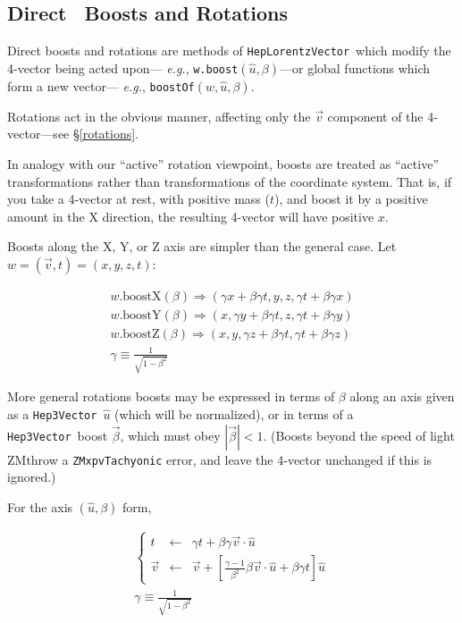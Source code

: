 \documentclass[twoside,12pt]{article}
\def \SV {{\tt Hep3Vector}}
\def \LV {{\tt HepLorentzVector}}
\begin{document}
\subsection{Direct \protect\LV\ Boosts and Rotations}

Direct boosts and rotations are methods of \LV\ which
modify the 4-vector being acted
upon--- {\it e.g.}, {\tt w.boost}$(\hat{u}, \beta)$---or
global functions which form a new
vector--- {\it e.g.}, {\tt boostOf}$(w, \hat{u}, \beta)$.

Rotations act in the obvious manner, affecting only the $\vec{v}$ component of
the 4-vector---see \S\ref{rotations}.

In analogy with our ``active'' rotation viewpoint, boosts are treated as
``active'' transformations rather than transformations of the coordinate system.
That is, if you take a 4-vector at rest, with positive mass ($t$),
and boost it by a positive amount in the X direction, the resulting 4-vector
will have positive $x$.

Boosts along the X, Y, or Z axis are simpler than the general case.
Let $w = (\vec{v}, t) = (x, y, z, t)$:

\begin{eqnarray}
\label{eq:wbX}
  w.\mbox{boostX} (\beta) \Longrightarrow
    ( \gamma x + \beta \gamma t, y, z, \gamma t + \beta \gamma x ) \\
\label{eq:wbY}
  w.\mbox{boostY} (\beta) \Longrightarrow
    ( x, \gamma y + \beta \gamma t, z, \gamma t + \beta \gamma y ) \\
\label{eq:wbZ}
  w.\mbox{boostZ} (\beta) \Longrightarrow
    ( x, y, \gamma z + \beta \gamma t, \gamma t + \beta \gamma z ) \\
  \gamma \equiv \frac{1}{\sqrt{1-\beta^2}} \nonumber
\end{eqnarray}


More general rotations boosts may be expressed in terms of
$\beta$ along an axis given as a \SV\ $\hat{u}$ (which will be normalized),
or in terms of a \SV\ boost $\vec{\beta}$, which must obey $|\vec{\beta}|<1$.
(Boosts beyond the speed of light ZMthrow a
{\tt ZMxpvTachyonic} error, and leave the 4-vector unchanged
if this is ignored.)

For the axis $(\hat{u}, \beta)$ form,

\begin{eqnarray}
\label{eq:pureboost}
  \left\{
  \begin{array}{lcl}
  t & \longleftarrow & \gamma t + \beta \gamma \vec{v} \cdot \hat{u} \\
  \vec{v} & \longleftarrow & \vec{v} + \left[
	\frac{\gamma-1}{\beta^2} \beta \vec{v} \cdot \hat{u}  +
	\beta \gamma t \right] \hat{u}
  \end{array}
  \right. \\
  \gamma \equiv \frac{1}{\sqrt{1-\beta^2}} \nonumber
\end{eqnarray}
\end{document}
